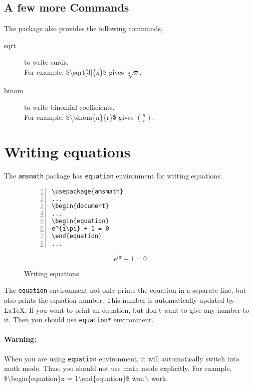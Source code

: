 \documentclass{article}
\begin{document}
\subsection{A few more Commands}
The  package also provides the following commands,
\begin{description}
	\item[sqrt] to write surds.\\
	For example, \$\textbackslash sqrt[3]\{x\}\$ gives $\sqrt[3]{x}$.
	\item[binom] to write binomial coefficients.\\
	For example, \$\textbackslash binom\{n\}\{r\}\$ gives $\binom{n}{r}$.
\end{description}

\section{Writing equations}
	The \texttt{amsmath} package has \texttt{equation} environment for writing equations.
\begin{figure}[h]
\centering
\begin{minipage}{0.45\textwidth}
\begin{Verbatim}[numbers = left]
\usepackage{amsmath}
...
\begin{document}
...
\begin{equation}
e^{i\pi} + 1 = 0
\end{equation}
...
\end{Verbatim}
\end{minipage}
\begin{minipage}{0.45\textwidth}
\begin{equation}
e^{i\pi} + 1 = 0
\end{equation}
\end{minipage} 
\caption{Writing equations}
\label{fig:equation}
\end{figure}

	The \texttt{equation} environment not only prints the equation in a separate line, but also prints the equation number. This number is automatically updated by \LaTeX{}. If you want to print an equation, but don't want to give any number to it. Then you should use \texttt{equation*} environment.
	
\paragraph{Warning:}
	When you are using \texttt{equation} environment, it will automatically switch into math mode. Thus, you should not use math mode explicitly. For example, \$\textbackslash begin\{equation\}x = 1\textbackslash end\{equation\}\$ won't work.
\end{document}
